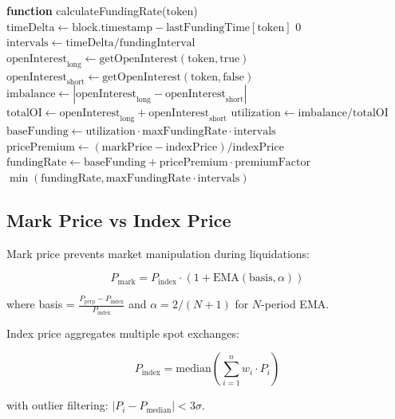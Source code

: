 \begin{algorithm}
\caption{Dynamic Funding Rate Calculation}
\begin{algorithmic}[1]
\STATE \textbf{function} calculateFundingRate($\text{token}$)
\STATE $\text{timeDelta} \gets \text{block.timestamp} - \text{lastFundingTime}[\text{token}]$
    \RETURN $0$
\ENDIF
\STATE $\text{intervals} \gets \text{timeDelta} / \text{fundingInterval}$
\STATE $\text{openInterest}_{\text{long}} \gets \text{getOpenInterest}(\text{token}, \text{true})$
\STATE $\text{openInterest}_{\text{short}} \gets \text{getOpenInterest}(\text{token}, \text{false})$
\STATE $\text{imbalance} \gets |\text{openInterest}_{\text{long}} - \text{openInterest}_{\text{short}}|$
\STATE $\text{totalOI} \gets \text{openInterest}_{\text{long}} + \text{openInterest}_{\text{short}}$
\STATE $\text{utilization} \gets \text{imbalance} / \text{totalOI}$
\STATE $\text{baseFunding} \gets \text{utilization} \cdot \text{maxFundingRate} \cdot \text{intervals}$
\STATE $\text{pricePremium} \gets (\text{markPrice} - \text{indexPrice}) / \text{indexPrice}$
\STATE $\text{fundingRate} \gets \text{baseFunding} + \text{pricePremium} \cdot \text{premiumFactor}$
\RETURN $\min(\text{fundingRate}, \text{maxFundingRate} \cdot \text{intervals})$
\end{algorithmic}
\end{algorithm}

\subsection{Mark Price vs Index Price}

Mark price prevents market manipulation during liquidations:

\begin{equation}
P_{\text{mark}} = P_{\text{index}} \cdot (1 + \text{EMA}(\text{basis}, \alpha))
\end{equation}

where basis = $\frac{P_{\text{perp}} - P_{\text{index}}}{P_{\text{index}}}$ and $\alpha = 2/(N+1)$ for $N$-period EMA.

Index price aggregates multiple spot exchanges:

\begin{equation}
P_{\text{index}} = \text{median}\left(\sum_{i=1}^{n} w_i \cdot P_i\right)
\end{equation}

with outlier filtering: $|P_i - P_{\text{median}}| < 3\sigma$.

